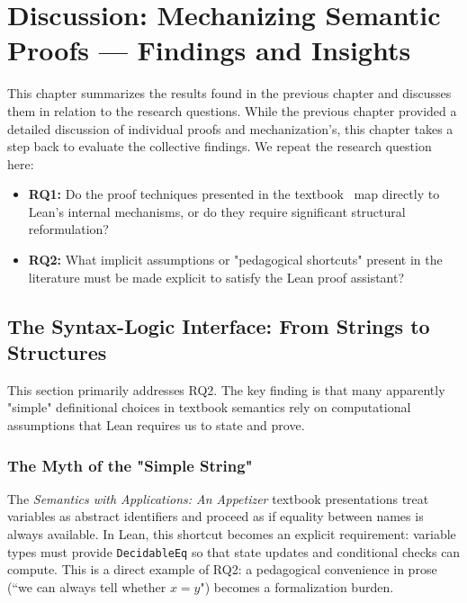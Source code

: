 %
%
%
%
%
%
\chapter{Discussion: Mechanizing Semantic Proofs — Findings and Insights}

This chapter summarizes the results found in the previous chapter and discusses
them in relation to the research questions. While the previous chapter provided
a detailed discussion of individual proofs and mechanization's, this
chapter takes a step back to evaluate the collective findings.
We repeat the research question here:

\begin{itemize}
    \item \textbf{RQ1:} Do the proof techniques presented in the textbook~\citep{nielson_semantics_2007}
    map directly to Lean's internal mechanisms, or do they require significant
    structural reformulation?

    \item \textbf{RQ2:} What implicit assumptions or "pedagogical shortcuts"
    present in the literature must be made explicit to satisfy the Lean proof assistant?
\end{itemize}

%
%
%
\section{The Syntax-Logic Interface: From Strings to Structures}
\label{discussion:sec:syntax_logic}

This section primarily addresses RQ2. The key finding is that many apparently
"simple" definitional choices in textbook semantics rely on computational
assumptions that Lean requires us to state and prove.

\subsection*{The Myth of the "Simple String"}
The \emph{Semantics with Applications: An Appetizer} textbook presentations treat variables as abstract identifiers and proceed as
if equality between names is always available. In Lean, this shortcut becomes
an explicit requirement: variable types must provide \texttt{DecidableEq} so
that state updates and conditional checks can compute. This is a direct example
of RQ2: a pedagogical convenience in prose (``we can always tell whether
$x = y$") becomes a formalization burden.

